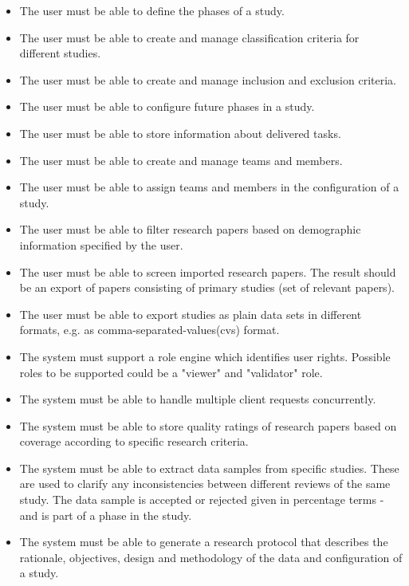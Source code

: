 \begin{itemize}
\item The user must be able to define the phases of a study. 
\item The user must be able to create and manage classification criteria for different studies.
\item The user must be able to create and manage inclusion and exclusion criteria.
\item The user must be able to configure future phases in a study.
\item The user must be able to store information about delivered tasks.
\item The user must be able to create and manage teams and members.
\item The user must be able to assign teams and members in the configuration of a study. 
\item The user must be able to filter research papers based on demographic information specified by the user. 
\item The user must be able to screen imported research papers. The result should be an export of papers consisting of primary studies (set of relevant papers). 
\item The user must be able to export studies as plain data sets in different formats, e.g. as comma-separated-values(cvs) format. 
\item The system must support a role engine which identifies user rights. Possible roles to be supported could be a "viewer" and "validator" role. 
\item The system must be able to handle multiple client requests concurrently. 
\item The system must be able to store quality ratings of research papers based on coverage according to specific research criteria.
\item The system must be able to extract data samples from specific studies. These are used to clarify any inconsistencies between different reviews of the same study. The data sample is accepted or rejected given in percentage terms - and is part of a phase in the study.
\item The system must be able to generate a research protocol that describes the rationale, objectives, design and methodology of the data and configuration of a study. 

\end{itemize}

